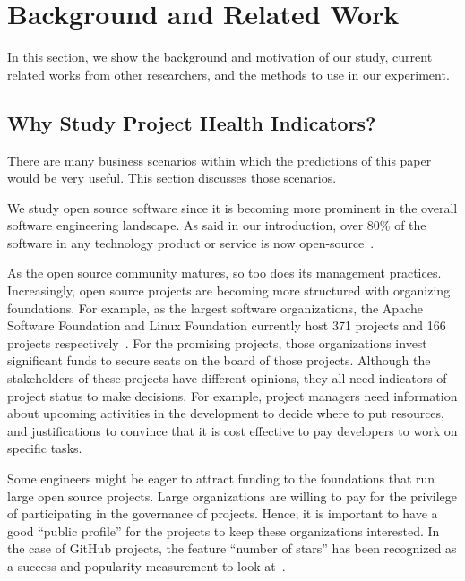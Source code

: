 \documentclass[smallextended]{svjour3}
\newcommand{\BLUE}{\color{blue}}
\newcommand{\BLACK}{\color{black}}
\begin{document}
\section{Background and Related Work}
\label{sect:backg}
In this section, we show the background and motivation of our study, current related works from other researchers, and the methods to use in our experiment.
\BLACK

\subsection{Why Study Project Health Indicators?}


There are many business scenarios within which the predictions of this paper would be very useful.
This section discusses those scenarios. 

We study open source software since it is becoming more prominent in the overall software engineering landscape. As said in our introduction, over 80\% of the software in any technology product or service is now open-source~\cite{zemlin2017}. 

As the open source community matures, so too does its management practices.
Increasingly, open source projects are becoming more structured with organizing foundations. For example, as the largest software organizations, the Apache Software Foundation and Linux Foundation currently host 371 projects and 166 projects respectively~\cite{apacheprojects,linuxprojects}. 
For the promising projects, those organizations invest significant funds to secure  seats on the board of those projects.
Although the stakeholders of these projects have different opinions, they all need indicators of project status to make decisions. For example, project managers need information about upcoming activities in the development to decide where to put resources, and justifications to convince that it is cost effective to pay developers to work on specific tasks. 

Some engineers might be  eager to attract funding to the foundations that run large open source projects. Large organizations are willing to pay for the privilege of participating in the governance of projects. Hence, it is important to have a good ``public profile'' for the projects to keep these organizations interested. In the case of GitHub projects, the feature ``number of stars'' has been recognized as a success and popularity measurement to look at~\cite{han2019characterization,borges2016understanding,borges2016predicting}. 
\end{document}
